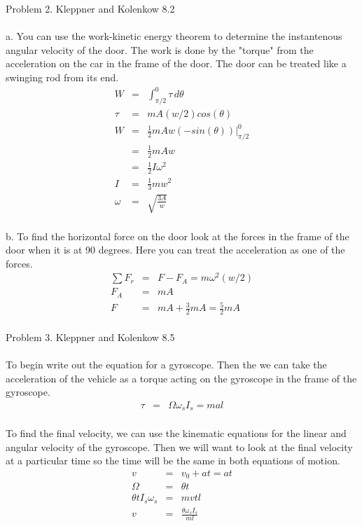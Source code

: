 \documentclass[11pt]{amsart}
\begin{document}
Problem 2. Kleppner and Kolenkow 8.2 \\ \\
a. You can use the work-kinetic energy theorem to determine the instantenous angular velocity of the door. The work is done by the "torque" from the acceleration on the car in the frame of the door. The door can be treated like a swinging rod from its end. \\
\begin{eqnarray*}
W &=& \int_{\pi/2}^{0}\tau{}\,d\theta \\
\tau &=& mA(w/2)cos(\theta) \\
W &=& \frac{1}{2}mAw(-sin(\theta))|_{\pi/2}^{0} \\
&=& \frac{1}{2}mAw \\
&=& \frac{1}{2}I\omega^{2} \\
I &=& \frac{1}{3}mw^{2} \\
\omega &=& \sqrt{\frac{3A}{w}} 
\end{eqnarray*} \\
b. To find the horizontal force on the door look at the forces in the frame of the door when it is at 90 degrees. Here you can treat the acceleration as one of the forces. \\
\begin{eqnarray*}
\sum{F_{r}} &=& F-F_{A} = m\omega^{2}(w/2) \\
F_{A} &=& mA \\
F &=& mA+\frac{3}{2}mA = \frac{5}{2}mA  
\end{eqnarray*} \\ 

Problem 3. Kleppner and Kolenkow 8.5	 \\ \\
To begin write out the equation for a gyroscope. Then the we can take the acceleration of the vehicle as a torque acting on the gyroscope in the frame of the gyroscope. \\
\begin{eqnarray*}
\tau &=& \Omega{}\omega_{s}I_{s} = mal 
\end{eqnarray*} \\
 To find the final velocity, we can use the kinematic equations for the linear and angular velocity of the gyroscope. Then we will want to look at the final velocity at a particular time so the time will be the same in both equations of motion. \\
\begin{eqnarray*}
v &=& v_{0}+at = at \\
\Omega &=& \theta{t} \\
\theta{t}I_{s}\omega_{s} &=& mvtl \\
v &=& \frac{\theta\omega_{s}I_{s}}{ml} 
\end{eqnarray*} \\
\end{document}
